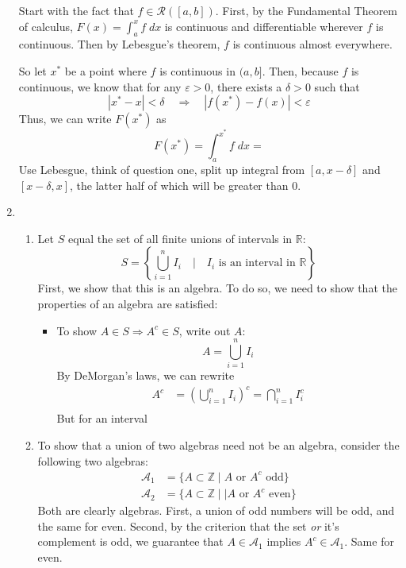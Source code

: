 \documentclass[12pt]{article}
\theoremstyle{plain}
\theoremstyle{definition}
\theoremstyle{remark}
\begin{document}
\begin{enumerate}
Start with the fact that $f\in\mathscr{R}([a,b])$. First, by the Fundamental Theorem of calculus, $F(x)=\int^x_a f\;dx$ is continuous and differentiable wherever $f$ is continuous. Then by Lebesgue's theorem, $f$ is continuous almost everywhere. 

So let $x^*$ be a point where $f$ is continuous in $(a,b]$. Then, because $f$ is continuous, we know that for any $\varepsilon>0$, there exists a $\delta>0$ such that 
\[
    |x^*-x|<\delta \quad \Rightarrow \quad |f(x^*)-f(x)|<\varepsilon
\]
Thus, we can write $F(x^*)$ as 
\[
    F(x^*) = \int^{x^*}_a f\;dx = 
\]
Use Lebesgue, think of question one, split up integral from $[a,x-\delta]$ and $[x-\delta, x]$, the latter half of which will be greater than 0.
    
\item 
\begin{enumerate}
\item 
Let $S$ equal the set of all finite unions of intervals in $\mathbb{R}$:
\[
    S = \left\{ \bigcup^n_{i=1} I_i \quad | \quad
    I_i \text{ is an interval in }  \mathbb{R} 
    \right\}
\]
First, we show that this is an algebra. To do so, we need to show that the properties of an algebra are satisfied:
\begin{itemize}
    \item To show $A\in{S}\Rightarrow A^c\in S$, write out $A$:
    \[ 
        A = \bigcup^n_{i=1} I_i  
    \]
    By DeMorgan's laws, we can rewrite
    \begin{align*}
        A^c &= \left(\bigcup^n_{i=1} I_i \right)^c 
        = \bigcap^n_{i=1} I^c_i  \\
    \end{align*}
    But for an interval 
    
\end{itemize}

\item To show that a union of two algebras need not be an algebra, consider the following two algebras:
\begin{align*}
    \mathscr{A}_1 &= \{ A \subset \mathbb{Z} \; | \;
        A \text{ or } A^c \text{ odd} \} \\
    \mathscr{A}_2 &= \{ A \subset \mathbb{Z} \; | \;| 
        A \text{ or } A^c \text{ even} \}
\end{align*}
Both are clearly algebras. First, a union of odd numbers will be odd, and the same for even. Second, by the criterion that the set \emph{or} it's complement is odd, we guarantee that $A\in\mathscr{A}_1$ implies $A^c\in\mathscr{A}_1$. Same for even.


\end{enumerate}
\end{enumerate}
\end{document}
